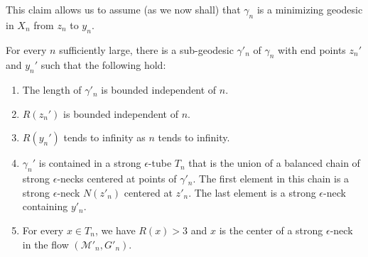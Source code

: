 This claim allows us to assume (as we now shall) that $\gamma_n$ is
a minimizing geodesic in $X_n$ from $z_n$ to $y_n$.


\begin{claim}
\label{claim:balanced-chain-subgeodesic}
For every $n$ sufficiently large, there is a sub-geodesic
$\gamma'_n$ of $\gamma_n$ with end points $z_n'$ and $y_n'$ such
that the following hold:
\begin{enumerate}
\item[(1)] The length of $\gamma'_n$ is bounded independent of $n$.
\item[(2)] $R(z_n')$ is bounded independent of $n$.
\item[(3)] $R(y_n')$ tends to infinity as $n$ tends to infinity.
\item[(4)] $\gamma_n'$ is contained in a strong $\epsilon$-tube
$T_n$ that is the union of a balanced
chain of strong
$\epsilon$-necks centered at points of $\gamma'_n$. The first
element in this chain is a strong $\epsilon$-neck $N(z'_n)$ centered
at $z'_n$. The last element is a strong $\epsilon$-neck containing
$y'_n$.
\item[(5)] For every  $x\in T_n$, we have $R(x)>3$ and $x$ is the center of a strong
$\epsilon$-neck in the flow $({\mathcal M}'_n,G'_n)$.
\end{enumerate}
\end{claim}

